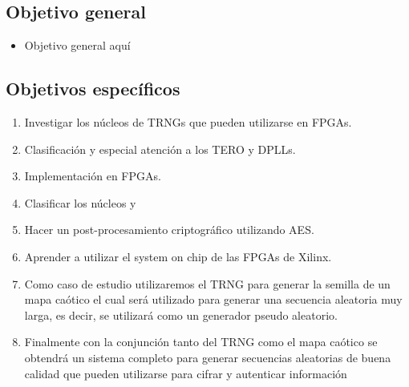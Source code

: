 		\subsection{Objetivo general}
			\begin{itemize}
				\item Objetivo general aquí
			\end{itemize}
		
		\subsection{Objetivos específicos}
			\begin{enumerate}
				\item Investigar los núcleos de TRNGs que pueden utilizarse en FPGAs.
				\item Clasificación y especial atención a los TERO y DPLLs.
				\item Implementación en FPGAs.
				\item Clasificar los núcleos y
				\item Hacer un post-procesamiento criptográfico utilizando AES.
				\item Aprender a utilizar el system on chip de las FPGAs de Xilinx.
				\item Como caso de estudio utilizaremos el TRNG para generar la semilla de un mapa caótico el cual será utilizado para generar una secuencia aleatoria muy larga, es decir, se utilizará como un generador pseudo aleatorio.
				\item Finalmente con la conjunción tanto del TRNG como el mapa caótico se obtendrá un sistema completo para generar secuencias aleatorias de buena calidad que pueden utilizarse para cifrar y autenticar información
			\end{enumerate}
